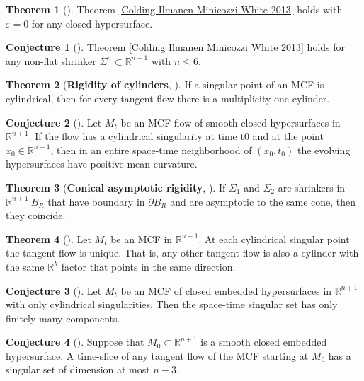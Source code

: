 \documentclass{amsart}
\theoremstyle{definition}
\newtheorem{Thm}{Theorem}[section]
\newtheorem{Con}{Conjecture}[section]
\begin{document}
 \begin{Thm}[\cite{Bernstein Wang 2016}]
Theorem \ref{Colding Ilmanen Minicozzi White 2013} holds  with $\varepsilon = 0$ for any closed hypersurface.
\end{Thm}

\begin{Con}[\cite{Colding Minicozzi Pedersen 2015}] Theorem \ref{Colding Ilmanen Minicozzi White 2013} holds for any 
non-flat shrinker ${\Sigma}^{n}  \subset {\mathbb{R}}^{n+1}$ with $n \leq 6$.
\end{Con}

\begin{Thm}[\textbf{Rigidity of cylinders}, \cite{Colding Ilmanen Minicozzi 2015}]
If a singular point of an MCF is cylindrical, then for every tangent flow there is a multiplicity one cylinder. 
\end{Thm}

\begin{Con}[\cite{Colding Minicozzi Pedersen 2015}] Let ${M}_{t}$  be an MCF flow of smooth closed hypersurfaces in 
${\mathbb{R}}^{n+1}$. If the flow has a cylindrical singularity at time t0 and at the point $x_0 \in {\mathbb{R}}^{n+1}$, then in an 
entire space-time neighborhood of $\left(x_0,t_0\right)$ the evolving hypersurfaces have positive mean curvature.
\end{Con}

\begin{Thm}[\textbf{Conical asymptotic rigidity}, \cite{Wang 2014}]
If ${\Sigma}_{1}$ and ${\Sigma}_{2}$ are shrinkers in ${\mathbb{R}}^{n+1} \ B_{R}$ that have boundary in $\partial B_{R}$ 
and are asymptotic to the same cone, then they coincide.
\end{Thm}

 \begin{Thm}[\cite{Colding Minicozzi 2015a}] Let ${M}_{t}$ be an MCF in ${\mathbb{R}}^{n+1}$. At each cylindrical singular 
 point the tangent flow is unique. That is, any other tangent flow is also a cylinder with the same ${\mathbb{R}}^{k}$ factor 
 that points in the same direction.
\end{Thm}
   
\begin{Con}[\cite{Colding Minicozzi 2016}]  
  Let ${M}_{t}$ be an MCF of closed embedded hypersurfaces in ${\mathbb{R}}^{n+1}$ with only cylindrical singularities. Then 
  the space-time singular set has only finitely many components.
\end{Con}

\begin{Con}[\cite{Ilmanen 1995}]  
 Suppose that  ${M}_{0}  \subset {\mathbb{R}}^{n+1}$ is a smooth closed embedded hypersurface. A time-slice of any tangent flow of the MCF starting at 
  ${M}_{0}$ has a singular set of dimension at most $n-3$.
\end{Con}
\end{document}
